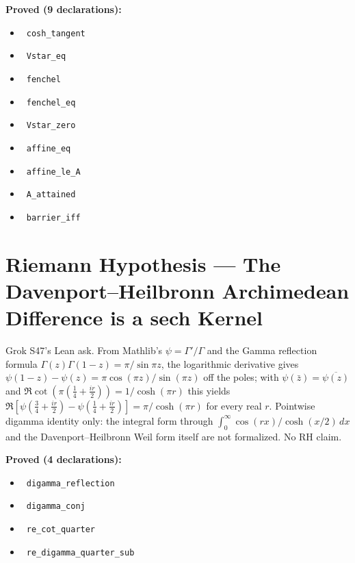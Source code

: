 \documentclass{report}
\theoremstyle{definition}
\begin{document}
\noindent\textbf{Proved (9 declarations):}
\begin{itemize}
  \item {}\leanok\ \texttt{cosh\_tangent}
  \item {}\leanok\ \texttt{Vstar\_eq}
  \item {}\leanok\ \texttt{fenchel}
  \item {}\leanok\ \texttt{fenchel\_eq}
  \item {}\leanok\ \texttt{Vstar\_zero}
  \item {}\leanok\ \texttt{affine\_eq}
  \item {}\leanok\ \texttt{affine\_le\_A}
  \item {}\leanok\ \texttt{A\_attained}
  \item {}\leanok\ \texttt{barrier\_iff}
\end{itemize}

\section{Riemann Hypothesis --- The Davenport--Heilbronn Archimedean Difference is a sech Kernel}
Grok S47's Lean ask. From Mathlib's $\psi=\Gamma'/\Gamma$ and the Gamma reflection formula $\Gamma(z)\Gamma(1-z)=\pi/\sin\pi z$, the logarithmic derivative gives $\psi(1-z)-\psi(z)=\pi\cos(\pi z)/\sin(\pi z)$ off the poles; with $\psi(\bar z)=\overline{\psi(z)}$ and $\Re\cot(\pi(\tfrac14+\tfrac{ir}{2}))=1/\cosh(\pi r)$ this yields $\Re[\psi(\tfrac34+\tfrac{ir}2)-\psi(\tfrac14+\tfrac{ir}2)]=\pi/\cosh(\pi r)$ for every real $r$. Pointwise digamma identity only: the integral form through $\int_0^\infty\cos(rx)/\cosh(x/2)\,dx$ and the Davenport--Heilbronn Weil form itself are not formalized. No RH claim.

\noindent\textbf{Proved (4 declarations):}
\begin{itemize}
  \item {}\leanok\ \texttt{digamma\_reflection}
  \item {}\leanok\ \texttt{digamma\_conj}
  \item {}\leanok\ \texttt{re\_cot\_quarter}
  \item {}\leanok\ \texttt{re\_digamma\_quarter\_sub}
\end{itemize}
\end{document}
